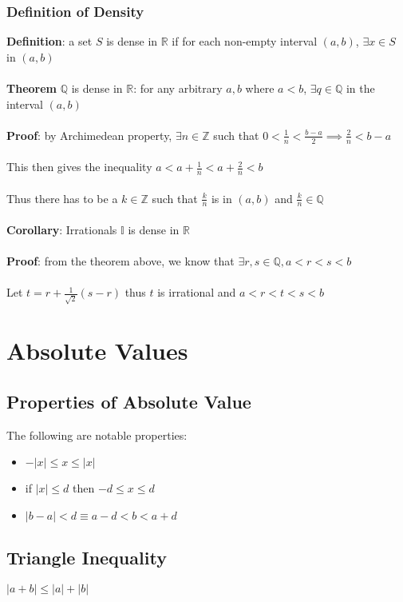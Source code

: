 \documentclass{article}
\begin{document}
  \subsubsection{Definition of Density}
  \textbf{Definition}: a set $S$ is dense in $\mathbb{R}$ if for each non-empty interval $(a, b)$, $\exists x \in S$ in $(a,b)$  \\ \\
  \textbf{Theorem} $\mathbb{Q}$ is dense in $\mathbb{R}$: for any arbitrary $a,b$ where $a < b$, $\exists q \in \mathbb{Q}$ in the interval $(a,b)$ \\ \\
  \textbf{Proof}: by Archimedean property, $\exists n \in \mathbb{Z}$ such that $0 < \frac{1}{n} < \frac{b-a}{2} \implies \frac{2}{n} < b-a$ \\ \\
    This then gives the inequality $a < a + \frac{1}{n} < a + \frac{2}{n} < b$ \\ \\
    Thus there has to be a $k \in \mathbb{Z}$ such that $\frac{k}{n}$ is in $(a,b)$ and $\frac{k}{n} \in \mathbb{Q}$ \\ \\
  \textbf{Corollary}: Irrationals $\mathbb{I}$ is dense in $\mathbb{R}$ \\ \\
  \textbf{Proof}: from the theorem above, we know that $\exists r, s \in \mathbb{Q}, a < r < s < b$ \\ \\
  Let $t = r + \frac{1}{\sqrt{2}}(s-r)$ thus $t$ is irrational and $a < r < t < s < b$
  \section{Absolute Values}
  \subsection{Properties of Absolute Value}
  The following are notable properties:
  \begin{itemize}
    \item $-|x| \leq x \leq |x|$
    \item if $|x| \leq d$ then $-d \leq x \leq d$
    \item $|b-a| < d \equiv a-d < b < a + d$
  \end{itemize}
  \subsection{Triangle Inequality}
  $|a + b| \leq |a| + |b|$
\end{document}
